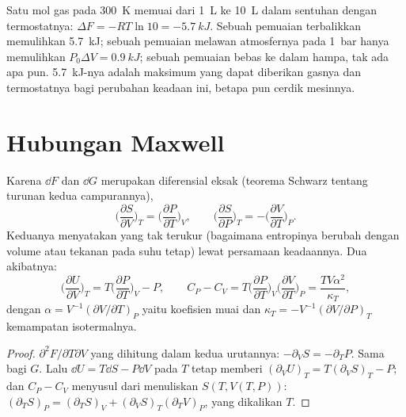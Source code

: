 \begin{example}\label{ex:b2:thermodynamic-potentials:expansion}
Satu mol gas pada \qty{300}{K} memuai dari \qty{1}{L} ke \qty{10}{L} dalam
sentuhan dengan termostatnya: $\Delta F = -RT\ln 10 = \qty{-5.7}{kJ}$. Sebuah
pemuaian terbalikkan memulihkan \qty{5.7}{kJ}; sebuah pemuaian melawan
atmosfernya pada \qty{1}{bar} hanya memulihkan $P_0\Delta V = \qty{0.9}{kJ}$; sebuah
pemuaian bebas ke dalam hampa, tak ada apa pun. \qty{5.7}{kJ}-nya adalah maksimum
yang dapat diberikan gasnya dan termostatnya bagi perubahan keadaan ini, betapa pun
cerdik mesinnya.
\end{example}

\section{Hubungan Maxwell}

\begin{theorem}\label{thm:b2:thermodynamic-potentials:maxwell}
Karena $\dd F$ dan $\dd G$ merupakan diferensial eksak (teorema Schwarz
tentang turunan kedua campurannya),
\[
\Big(\frac{\partial S}{\partial V}\Big)_T = \Big(\frac{\partial P}{\partial T}\Big)_V,
\qquad
\Big(\frac{\partial S}{\partial P}\Big)_T = -\Big(\frac{\partial V}{\partial T}\Big)_P .
\]
Keduanya menyatakan yang tak terukur (bagaimana entropinya berubah dengan volume atau
tekanan pada suhu tetap) lewat persamaan keadaannya. Dua
akibatnya:
\[
\Big(\frac{\partial U}{\partial V}\Big)_T = T\Big(\frac{\partial P}{\partial T}\Big)_V - P,
\qquad
C_P - C_V = T\Big(\frac{\partial P}{\partial T}\Big)_V\Big(\frac{\partial V}{\partial T}\Big)_P
= \frac{TV\alpha^2}{\kappa_T} ,
\]
dengan $\alpha = V^{-1}(\partial V/\partial T)_P$ yaitu koefisien muai dan
$\kappa_T = -V^{-1}(\partial V/\partial P)_T$ kemampatan isotermalnya.
\end{theorem}

\begin{proof}
$\partial^2F/\partial T\partial V$ yang dihitung dalam kedua urutannya: $-\partial_VS =
-\partial_TP$. Sama bagi $G$. Lalu $\dd U = T\dd S - P\dd V$ pada $T$ tetap
memberi $(\partial_VU)_T = T(\partial_VS)_T - P$; dan $C_P - C_V$ menyusul
dari menuliskan $S(T,V(T,P))$: $(\partial_TS)_P = (\partial_TS)_V +
(\partial_VS)_T(\partial_TV)_P$, yang dikalikan $T$.
\end{proof}

